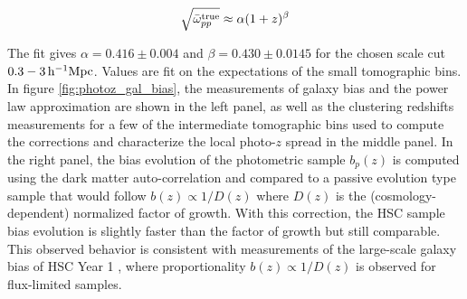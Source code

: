\begin{equation}\label{eq:photoz_bias_model}
\sqrt{\bar{\omega}_{pp}^{\mathrm{true}}}\approx \alpha(1+z)^{\beta}
\end{equation}


\noindent The fit gives $\alpha=0.416\pm 0.004$ and $\beta=0.430\pm{0.0145}$ for the chosen scale cut $0.3-3\,\mathrm{h}^{-1}\mathrm{Mpc}$. Values are fit on the expectations of the small tomographic bins. In figure \ref{fig:photoz_gal_bias}, the measurements of galaxy bias and the power law approximation are shown in the left panel, as well as the clustering redshifts measurements for a few of the intermediate tomographic bins used to compute the corrections and characterize the local photo-$z$ spread in the middle panel. In the right panel, the bias evolution of the photometric sample $b_p(z)$ is computed using the dark matter auto-correlation and compared to a passive evolution type sample that would follow $b(z)\propto 1/D(z)$ where $D(z)$ is the (cosmology-dependent) normalized factor of growth. With this correction, the HSC sample bias evolution is slightly faster than the factor of growth but still comparable. This observed behavior is consistent with measurements of the large-scale galaxy bias of HSC Year 1 \cite{Nicola2020TomoclusteringHSCY1}, where proportionality $b(z)\propto1/D(z)$ is observed for flux-limited samples.

